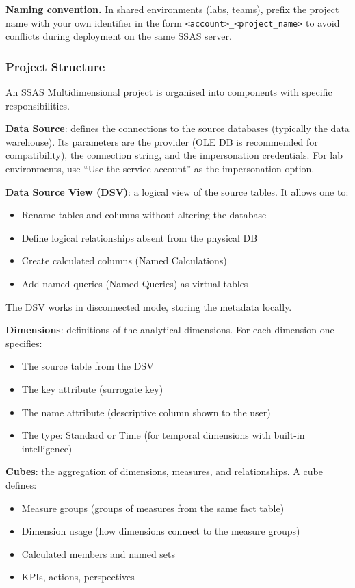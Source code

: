 \begin{notebox}
\textbf{Naming convention.}
In shared environments (labs, teams), prefix the project name with your own identifier in the form \texttt{<account>\_<project\_name>} to avoid conflicts during deployment on the same SSAS server.
\end{notebox}

\subsubsection{Project Structure}
\label{subsec:ssas-project-structure}

An SSAS Multidimensional project is organised into components with specific responsibilities.

\textbf{Data Source}: defines the connections to the source databases (typically the data warehouse). Its parameters are the provider (OLE DB is recommended for compatibility), the connection string, and the impersonation credentials. For lab environments, use ``Use the service account'' as the impersonation option.

\textbf{Data Source View (DSV)}: a logical view of the source tables. It allows one to:
\begin{itemize}
    \item Rename tables and columns without altering the database
    \item Define logical relationships absent from the physical DB
    \item Create calculated columns (Named Calculations)
    \item Add named queries (Named Queries) as virtual tables
\end{itemize}
The DSV works in disconnected mode, storing the metadata locally.

\textbf{Dimensions}: definitions of the analytical dimensions. For each dimension one specifies:
\begin{itemize}
    \item The source table from the DSV
    \item The key attribute (surrogate key)
    \item The name attribute (descriptive column shown to the user)
    \item The type: Standard or Time (for temporal dimensions with built-in intelligence)
\end{itemize}

\textbf{Cubes}: the aggregation of dimensions, measures, and relationships. A cube defines:
\begin{itemize}
    \item Measure groups (groups of measures from the same fact table)
    \item Dimension usage (how dimensions connect to the measure groups)
    \item Calculated members and named sets
    \item KPIs, actions, perspectives
\end{itemize}

